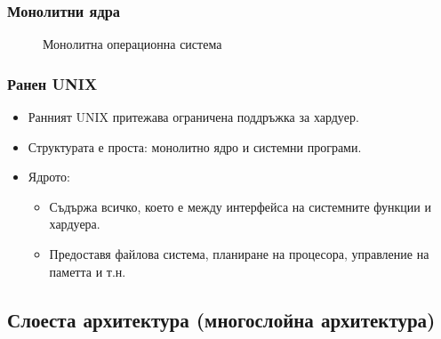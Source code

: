 \documentclass[ignorenonframetext, hyperref=unicode]{beamer}
\begin{document}
\begin{frame}
\frametitle{Монолитни ядра}
\begin{figure}[h]
\center
{}
\caption{Монолитна операционна система}
\end{figure}
\end{frame}


\begin{frame}
\frametitle{Ранен UNIX}
\begin{itemize}
\item Ранният UNIX притежава ограничена поддръжка за хардуер.
\item Структурата е проста: монолитно ядро и системни програми.
\item Ядрото:
\begin{itemize}
  \item Съдържа всичко, което е между интерфейса на системните функции и
  хардуера.
  \item Предоставя файлова система, планиране на процесора, управление на
  паметта и т.н.
\end{itemize}
\end{itemize}
\end{frame}

\subsection{Слоеста архитектура (многослойна архитектура)}
\end{document}
